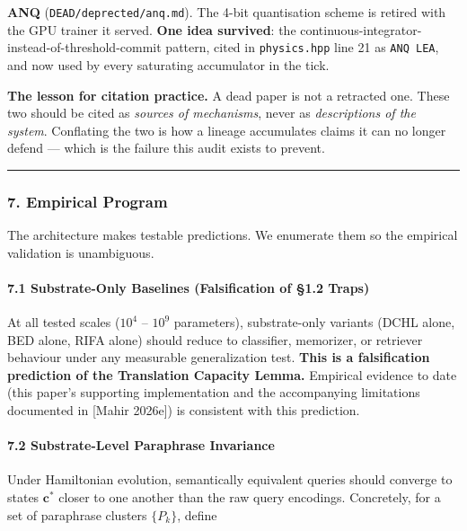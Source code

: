 \documentclass[
  11pt,
  a4paper,
]{article}
\begin{document}
\textbf{ANQ} (\texttt{DEAD/deprected/anq.md}). The 4-bit quantisation
scheme is retired with the GPU trainer it served. \textbf{One idea
survived}: the continuous-integrator-instead-of-threshold-commit
pattern, cited in \texttt{physics.hpp} line 21 as \texttt{ANQ\ LEA}, and
now used by every saturating accumulator in the tick.

\textbf{The lesson for citation practice.} A dead paper is not a
retracted one. These two should be cited as \emph{sources of
mechanisms}, never as \emph{descriptions of the system}. Conflating the
two is how a lineage accumulates claims it can no longer defend ---
which is the failure this audit exists to prevent.

\begin{center}\rule{0.5\linewidth}{0.5pt}\end{center}

\subsubsection{7. Empirical Program}\label{empirical-program}

The architecture makes testable predictions. We enumerate them so the
empirical validation is unambiguous.

\paragraph{7.1 Substrate-Only Baselines (Falsification of §1.2
Traps)}\label{substrate-only-baselines-falsification-of-1.2-traps}

At all tested scales (\(10^4\) -- \(10^9\) parameters), substrate-only
variants (DCHL alone, BED alone, RIFA alone) should reduce to
classifier, memorizer, or retriever behaviour under any measurable
generalization test. \textbf{This is a falsification prediction of the
Translation Capacity Lemma.} Empirical evidence to date (this paper's
supporting implementation and the accompanying limitations documented in
{[}Mahir 2026e{]}) is consistent with this prediction.

\paragraph{7.2 Substrate-Level Paraphrase
Invariance}\label{substrate-level-paraphrase-invariance}

Under Hamiltonian evolution, semantically equivalent queries should
converge to states \(\mathbf{c}^*\) closer to one another than the raw
query encodings. Concretely, for a set of paraphrase clusters
\(\{P_k\}\), define
\end{document}
